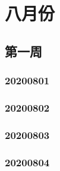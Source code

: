 \chapter{八月份}
  \section{第一周}
  \subsection{20200801}
  
  \subsection{20200802}
  
  \subsection{20200803}
  
  \subsection{20200804}
  

